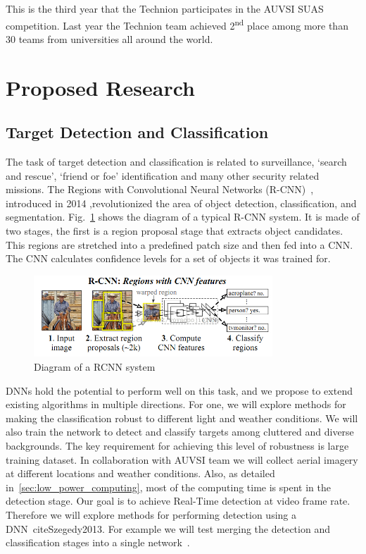 \documentclass{article} %
\begin{document}
This is the third year that the Technion participates in the AUVSI SUAS
competition. Last year the Technion team achieved 2\textsuperscript{nd} place
among more than 30 teams from universities all around the world.

\section{Proposed Research}

\subsection{Target Detection and Classification}
\label{sec:target_detect_and_class}

The task of target detection and classification is related to surveillance,
`search and rescue', `friend or foe' identification and many other security
related missions. The Regions with Convolutional Neural Networks
(R-CNN)~\cite{Girshick2014}, introduced in 2014 ,revolutionized the area of
object detection, classification, and segmentation. Fig.~\ref{fig:RCNN} shows the
diagram of a typical R-CNN system. It is made of two stages, the first is a
region proposal stage that extracts object candidates. This regions are
stretched into a predefined patch size and then fed into a CNN. The CNN
calculates confidence levels for a set of objects it was trained for.
\begin{figure}[h]
	\centering
	\includegraphics[width=0.8\textwidth]{RCNN}
	\caption{Diagram of a RCNN system}
	\label{fig:RCNN}
\end{figure}

DNNs hold the potential to perform well on this task, and we propose to extend
existing algorithms in multiple directions. For one, we will explore
methods for making the classification robust to different light and weather
conditions. We will also train the network to detect and classify targets among
cluttered and diverse backgrounds. The key requirement for achieving this level
of robustness is large training dataset. In collaboration with AUVSI team we
will collect aerial imagery at different locations and weather conditions. Also, as detailed
in~\cref{sec:low_power_computing}, most of the computing time is spent in the detection
stage. Our goal is to achieve Real-Time detection at video frame rate. Therefore we will
explore methods for performing detection using a DNN~cite{Szegedy2013}.
For example we will test merging the detection and classification stages into a
single network~\cite{long2014fully}.
\end{document}
